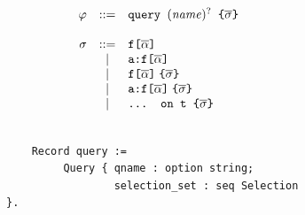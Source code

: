 \begin{figure}[h]
  \centering
  \begin{subfigure}{.5\textwidth}
  \begin{displaymath}
	\begin{array}{rcl}
	\varphi & ::= & \texttt{query } (\mathit{name})^{?} \texttt{ \{}  \overline{\sigma} \texttt{\}} \\
	&& \\
	\sigma & ::= & \texttt{f[}\overline{\alpha}\texttt{]} \\
	& | & \texttt{a:}\texttt{f[}\overline{\alpha}\texttt{]} \\		
	& | & \texttt{f[}\overline{\alpha}\texttt{]}\; \texttt{\{}\overline{\sigma}\texttt{\}} \\
	& | & \texttt{a:}\texttt{f[}\overline{\alpha}\texttt{]}\; \texttt{\{}\overline{\sigma}\texttt{\}} \\
	& | & \texttt{... on t \{}\overline{\sigma}\texttt{\}} \\
	\end{array}
	\end{displaymath}
	

    
  \end{subfigure}%
  \begin{subfigure}{.5\textwidth}

    \begin{verbatim}
    
    Record query := 
         Query { qname : option string; 
                 selection_set : seq Selection }.
                   

\end{verbatim}
\end{subfigure}
\end{figure}
